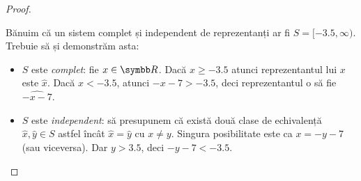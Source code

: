 \begin{proof}
\begin{enumerate}
    Bănuim că un sistem complet și independent de reprezentanți ar fi \(S = [-3.5, \infty)\). Trebuie să și demonstrăm asta:
    \begin{itemize}
        \item \(S\) este \emph{complet}: fie \(x \in \reals\). Dacă \(x \geq -3.5\) atunci reprezentantul lui \(x\) este \(\widehat{x}\). Dacă \(x < -3.5\), atunci \(-x - 7 > -3.5\), deci reprezentantul o să fie \(\widehat{-x-7}\).
        \item \(S\) este \emph{independent}: să presupunem că există două clase de echivalență \(\widehat{x}, \widehat{y} \in S\) astfel încât \(\widehat{x} = \widehat{y}\) cu \(x \neq y\). Singura posibilitate este ca \(x = -y - 7\) (sau viceversa). Dar \(y > 3.5\), deci \(-y -7 < -3.5\). 
    \end{itemize}
\end{enumerate}
\end{proof}

